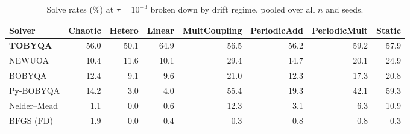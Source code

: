\begin{table}[t]
\centering\footnotesize
\setlength{\tabcolsep}{3pt}
\caption{Solve rates (\%) at $\tau=10^{-3}$ broken down by drift regime, pooled over all $n$ and seeds.}
\label{tab:env-breakdown}
\begin{tabular}{lrrrrrrr}
\toprule
Solver & Chaotic & Hetero & Linear & MultCoupling & PeriodicAdd & PeriodicMult & Static \\
\midrule
\textbf{TOBYQA} & 56.0 & 50.1 & 64.9 & 56.5 & 56.2 & 59.2 & 57.9 \\
NEWUOA & 10.4 & 11.6 & 10.1 & 29.4 & 14.7 & 20.1 & 24.9 \\
BOBYQA & 12.4 & 9.1 & 9.6 & 21.0 & 12.3 & 17.3 & 20.8 \\
Py-BOBYQA & 14.2 & 3.0 & 4.0 & 55.4 & 19.3 & 42.1 & 59.3 \\
Nelder--Mead & 1.1 & 0.0 & 0.6 & 12.3 & 3.1 & 6.3 & 10.9 \\
BFGS (FD) & 1.9 & 0.0 & 0.4 & 0.3 & 0.8 & 0.8 & 0.3 \\
\bottomrule
\end{tabular}
\end{table}